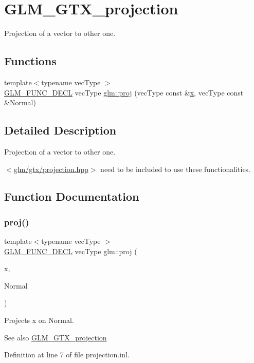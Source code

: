 \hypertarget{group__gtx__projection}{}\section{G\+L\+M\+\_\+\+G\+T\+X\+\_\+projection}
\label{group__gtx__projection}


Projection of a vector to other one.  


\subsection*{Functions}
\begin{DoxyCompactItemize}
\item 
{\footnotesize template$<$typename vec\+Type $>$ }\\\mbox{\hyperlink{setup_8hpp_ab2d052de21a70539923e9bcbf6e83a51}{G\+L\+M\+\_\+\+F\+U\+N\+C\+\_\+\+D\+E\+CL}} vec\+Type \mbox{\hyperlink{group__gtx__projection_gadf29123bcf748fc9d6fb0998192184cf}{glm\+::proj}} (vec\+Type const \&\mbox{\hyperlink{glad_8h_a92d0386e5c19fb81ea88c9f99644ab1d}{x}}, vec\+Type const \&Normal)
\end{DoxyCompactItemize}


\subsection{Detailed Description}
Projection of a vector to other one. 

$<$\mbox{\hyperlink{projection_8hpp}{glm/gtx/projection.\+hpp}}$>$ need to be included to use these functionalities. 

\subsection{Function Documentation}
\mbox{\label{group__gtx__projection_gadf29123bcf748fc9d6fb0998192184cf}} 
\subsubsection{\texorpdfstring{proj()}{proj()}}
{\footnotesize\ttfamily template$<$typename vec\+Type $>$ \\
\mbox{\hyperlink{setup_8hpp_ab2d052de21a70539923e9bcbf6e83a51}{G\+L\+M\+\_\+\+F\+U\+N\+C\+\_\+\+D\+E\+CL}} vec\+Type glm\+::proj (\begin{DoxyParamCaption}\item[{vec\+Type const \&}]{x,  }\item[{vec\+Type const \&}]{Normal }\end{DoxyParamCaption})}

Projects x on Normal.

\begin{DoxySeeAlso}{See also}
\mbox{\hyperlink{group__gtx__projection}{G\+L\+M\+\_\+\+G\+T\+X\+\_\+projection}} 
\end{DoxySeeAlso}


Definition at line 7 of file projection.\+inl.

